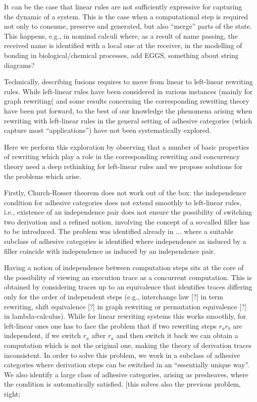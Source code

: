 \documentclass[a4paper]{article}
\theoremstyle{definition}
\begin{document}
It can be the case that linear rules are not sufficiently expressive for capturing the dynamic of a system. This is the case when  a computational step is required not only to consume, preserve and generated, but also ``merge'' parts of the state. This happens, e.g., in nominal calculi where, as a result of name passing, the received name is identified with a local one at the receiver, in the modelling of bonding in biological/chemical processes, add EGGS, something about string diagrams?

Technically, describing fusions requires to move from linear to left-linear rewriting rules. While left-linear rules have been considered in various instances (mainly for graph rewriting( and some results concerning the corresponding rewriting theory have been put forward, to the best of our knowledge the phenomena arising when rewriting with left-linear rules in the general setting of adhesive categories (which capture most ``applications'') have not been systematically explored.

Here we perform this exploration by observing that a number of basic
properties of rewriting which play a role in the corresponding
rewriting and concurrency theory need a deep rethinking for
left-linear rules and we propose solutions for the problems which
arise.

Firstly, Church-Rosser theorem does not work out of the box: the independence condition for adhesive categories does not extend smoothly to left-linear rules, i.e., existence of an independence pair does not ensure the possibility of switching two derivation and a refined notion, involving the concept of a so-called filler has to be introduced. The problem was identified already in ... where a suitable subclass of adhesive categories is identified where independence as induced by a filler coincide with independence as induced by an independence pair.

Having a notion of independence between computation steps sits at the core of the possibility of viewing an execution trace as a concurrent computation. This is obtained by considering traces up to an equivalence that identifies traces differing only for the order of independent steps (e.g., interchange law [?] in term rewriting, shift equivalence [?] in graph rewriting or permutation equivalence [?] in lambda-calculus). While for linear rewriting systems this works smoothly, for left-linear ones one has to face the problem that if two rewriting steps $r_a r_b$ are independent, if we switch $r_a$ after $r_a$ and then switch it back we can obtain a computation which is not the original one, making the theory of derivation traces inconsistent. In order to solve this problem, we work in a subclass of adhesive categories where derivation steps can be switched in an ``essentially unique way''. We also identify a large class of adhesive categories, arising as presheaves, where the condition is automatically satisfied. [this solves also the previous problem, right;
\end{document}
